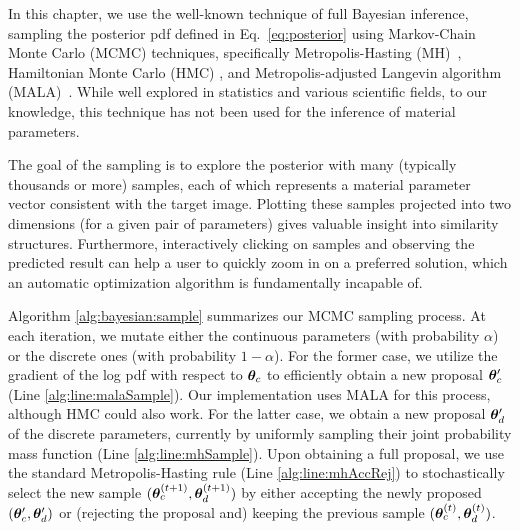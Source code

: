 In this chapter, we use the well-known technique of full Bayesian inference, sampling the posterior pdf defined in Eq.~\eqref{eq:posterior} using Markov-Chain Monte Carlo (MCMC) techniques, specifically Metropolis-Hasting (MH)~\cite{hastings1970monte}, Hamiltonian Monte Carlo (HMC) \cite{betancourt2017conceptual}, and Metropolis-adjusted Langevin algorithm (MALA)~\cite{roberts1996exponential}. While well explored in statistics and various scientific fields, to our knowledge, this technique has not been used for the inference of material parameters.

The goal of the sampling is to explore the posterior with many (typically thousands or more) samples, each of which represents a material parameter vector consistent with the target image. Plotting these samples projected into two dimensions (for a given pair of parameters) gives valuable insight into similarity structures. Furthermore, interactively clicking on samples and observing the predicted result can help a user to quickly zoom in on a preferred solution, which an automatic optimization algorithm is fundamentally incapable of.



Algorithm \ref{alg:bayesian:sample} summarizes our MCMC sampling process. At each iteration, we mutate either the continuous parameters (with probability $\alpha$) or the discrete ones (with probability $1 - \alpha$).
For the former case, we utilize the gradient of the log pdf with respect to $\bm\theta_c$ to efficiently obtain a new proposal $\bm\theta_c'$ (Line \ref{alg:line:malaSample}).
Our implementation uses MALA for this process, although HMC could also work.
For the latter case, we obtain a new proposal $\bm\theta_d'$ of the discrete parameters, currently by uniformly sampling their joint probability mass function (Line \ref{alg:line:mhSample}).
Upon obtaining a full proposal, we use the standard Metropolis-Hasting rule (Line \ref{alg:line:mhAccRej}) to stochastically select the new sample $(\bm\theta_c^{(t + 1)}, \bm\theta_d^{(t + 1)})$ by either accepting the newly proposed $(\bm\theta_c', \bm\theta_d')$ or (rejecting the proposal and) keeping the previous sample $(\bm\theta_c^{(t)}, \bm\theta_d^{(t)})$.
